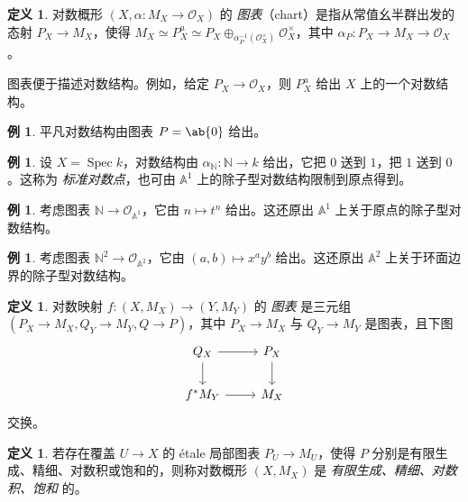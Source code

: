 \documentclass{amsart}
\theoremstyle{definition}
\newtheorem{defn}[thm]{定义}
\newtheorem{exm}[thm]{例}
\theoremstyle{remark}
\theoremstyle{plain}
\theoremstyle{definition}
\theoremstyle{remark}
\newcommand{\A}{\mathbb{A}}
\newcommand{\N}{\mathbb{N}}
\newcommand{\mc}[1]{\mathcal{#1}}
\newcommand{\1}{\mathbf{1}}
\newcommand{\2}{\mathbf{2}}
\newcommand{\3}{\mathbf{3}}
\DeclareMathOperator{\Spec}{Spec}
\begin{document}
\begin{defn}
    对数概形 \((X, \alpha \colon M_X \to \mc{O}_X)\) 的 \textit{图表}（chart）是指从常值幺半群出发的态射 \(P_X \to M_X\)，使得 \(M_X \simeq P_X^a \simeq P_X \oplus_{\alpha_P^{-1}(\mc{O}_X^{\times})} \mc{O}_X^{\times}\)，其中 \(\alpha_P \colon P_X \to M_X \to \mc{O}_X\)。
\end{defn}

图表便于描述对数结构。例如，给定 \(P_X \to \mc{O}_X\)，则 \(P_X^a\) 给出 \(X\) 上的一个对数结构。

\begin{exm}
    平凡对数结构由图表 \(P = \ab\{0\}\) 给出。
\end{exm}

\begin{exm}
    设 \(X = \Spec k\)，对数结构由 \(\alpha_{\N} \colon \N \to k\) 给出，它把 \(0\) 送到 \(1\)，把 \(1\) 送到 \(0\)。这称为 \textit{标准对数点}，也可由 \(\A^1\) 上的除子型对数结构限制到原点得到。
\end{exm}

\begin{exm}
    考虑图表 \(\N \to \mc{O}_{\A^1}\)，它由 \(n \mapsto t^n\) 给出。这还原出 \(\A^1\) 上关于原点的除子型对数结构。
\end{exm}

\begin{exm}
    考虑图表 \(\N^2 \to \mc{O}_{\A^2}\)，它由 \((a,b) \mapsto x^a y^b\) 给出。这还原出 \(\A^2\) 上关于环面边界的除子型对数结构。   
\end{exm}

\begin{defn}
    对数映射 \(f \colon (X, M_X) \to (Y, M_Y)\) 的 \textit{图表} 是三元组 \((P_X\to M_X, Q_Y \to M_Y, Q \to P)\)，其中 \(P_X \to M_X\) 与 \(Q_Y \to M_Y\) 是图表，且下图
    \begin{equation*}
    \begin{tikzcd}
        Q_X \ar{r} \ar{d} & P_X \ar{d} \\
        f^* M_Y \ar{r} & M_X
    \end{tikzcd}
    \end{equation*}
    交换。
\end{defn}

\begin{defn}
    若存在覆盖 \(U \to X\) 的 \'etale 局部图表 \(P_U \to M_U\)，使得 \(P\) 分别是有限生成、精细、对数积或饱和的，则称对数概形 \((X, M_X)\) 是 \textit{有限生成、精细、对数积、饱和} 的。
\end{defn}
\end{document}
